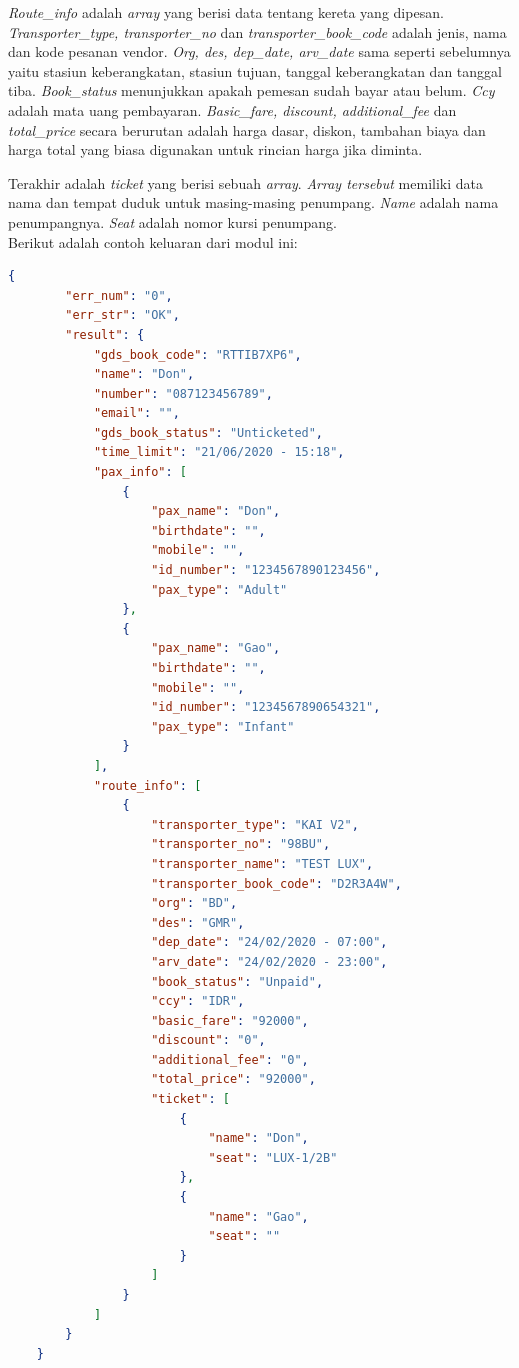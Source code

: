 \textit{Route\_info} adalah \textit{array} yang berisi data tentang kereta yang dipesan. \textit{Transporter\_type, transporter\_no} dan \textit{transporter\_book\_code} adalah jenis, nama dan kode pesanan vendor. \textit{Org, des, dep\_date, arv\_date} sama seperti sebelumnya yaitu stasiun keberangkatan, stasiun tujuan, tanggal keberangkatan dan tanggal tiba. \textit{Book\_status} menunjukkan apakah pemesan sudah bayar atau belum. \textit{Ccy} adalah mata uang pembayaran. \textit{Basic\_fare, discount, additional\_fee} dan \textit{total\_price} secara berurutan adalah harga dasar, diskon, tambahan biaya dan harga total yang biasa digunakan untuk rincian harga jika diminta. 

Terakhir adalah \textit{ticket} yang berisi sebuah \textit{array}. \textit{Array tersebut} memiliki data nama dan tempat duduk untuk masing-masing penumpang. \textit{Name} adalah nama penumpangnya. \textit{Seat} adalah nomor kursi penumpang.\\

Berikut adalah contoh keluaran dari modul ini:

\begin{lstlisting}[language=json]
    {
        "err_num": "0",
        "err_str": "OK",
        "result": {
            "gds_book_code": "RTTIB7XP6",
            "name": "Don",
            "number": "087123456789",
            "email": "",
            "gds_book_status": "Unticketed",
            "time_limit": "21/06/2020 - 15:18",
            "pax_info": [
                {
                    "pax_name": "Don",
                    "birthdate": "",
                    "mobile": "",
                    "id_number": "1234567890123456",
                    "pax_type": "Adult"
                },
                {
                    "pax_name": "Gao",
                    "birthdate": "",
                    "mobile": "",
                    "id_number": "1234567890654321",
                    "pax_type": "Infant"
                }
            ],
            "route_info": [
                {
                    "transporter_type": "KAI V2",
                    "transporter_no": "98BU",
                    "transporter_name": "TEST LUX",
                    "transporter_book_code": "D2R3A4W",
                    "org": "BD",
                    "des": "GMR",
                    "dep_date": "24/02/2020 - 07:00",
                    "arv_date": "24/02/2020 - 23:00",
                    "book_status": "Unpaid",
                    "ccy": "IDR",
                    "basic_fare": "92000",
                    "discount": "0",
                    "additional_fee": "0",
                    "total_price": "92000",
                    "ticket": [
                        {
                            "name": "Don",
                            "seat": "LUX-1/2B"
                        },
                        {
                            "name": "Gao",
                            "seat": ""
                        }
                    ]
                }
            ]
        }
    }
\end{lstlisting}

